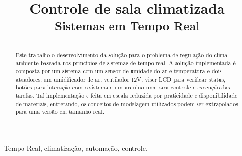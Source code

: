 \documentclass[conference]{IEEEtran}
\begin{document}
\title{Controle de sala climatizada\\
	{\footnotesize \textsuperscript{Sistemas em Tempo Real}}
}

\author{
	\and
	\and
	\and
}
\maketitle

\begin{abstract}
	
	Este trabalho o desenvolvimento da solução para o problema de regulação do clima ambiente baseada nos princípios de sistemas de tempo real. A solução implementada é composta por um sistema com um sensor de umidade do ar e temperatura e dois atuadores: um umidificador de ar, ventilador 12V, visor LCD para verificar status, botões para interação com o sistema e um arduino uno para controle e execução das tarefas. Tal implementação é feita em escala reduzida por praticidade e disponibilidade de materiais, entretando, os conceitos de modelagem utilizados podem ser extrapolados para uma versão em tamanho real. 
\end{abstract}

\begin{IEEEkeywords}
	Tempo Real, climatização, automação, controle.
\end{IEEEkeywords}
\end{document}
